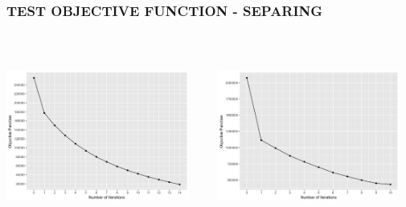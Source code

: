 \documentclass[10pt, compress]{beamer}
\begin{document}
\begin{frame}[fragile]
	\frametitle{TEST OBJECTIVE FUNCTION - SEPARING}
	
	\begin{columns}[onlytextwidth]
		\hspace{-8 mm}
		\begin{column}{0.5\textwidth}
			\includegraphics[width=6cm,height=6cm]{images_ready/GFO_4_sep.png}
			
		\end{column}
		\hspace{5 mm}
		\begin{column}{0.5\textwidth}
			\includegraphics[width=6cm,height=6cm]{images_ready/GFO_8_sep.png}
			
		\end{column}
	\end{columns}
	
\end{frame}
\end{document}
